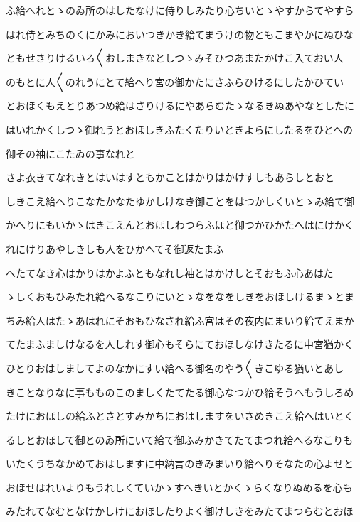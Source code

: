 \documentclass[a4paper,11pt,landscape]{ltjtarticle}
\begin{document}
ふ給へれとゝのゐ所のはしたなけに侍りしみたり心ちいとゝやすからてやすら
\par\medskip
はれ侍とみちのくにかみにおいつきかき給てまうけの物ともこまやかにぬひな
\par\medskip
ともせさりけるいろ〱おしまきなとしつゝみそひつあまたかけこ入ておい人
\par\medskip
のもとに人〱のれうにとて給へり宮の御かたにさふらひけるにしたかひてい
\par\medskip
とおほくもえとりあつめ給はさりけるにやあらむたゝなるきぬあやなとしたに
\par\medskip
はいれかくしつゝ御れうとおほしきふたくたりいときよらにしたるをひとへの
\par\medskip
御その袖にこたゐの事なれと
\par\medskip
さよ衣きてなれきとはいはすともかことはかりはかけすしもあらしとおと
\par\medskip
しきこえ給へりこなたかなたゆかしけなき御ことをはつかしくいとゝみ給て御
\par\medskip
かへりにもいかゝはきこえんとおほしわつらふほと御つかひかたへはにけかく
\par\medskip
れにけりあやしきしも人をひかへてそ御返たまふ
\par\medskip
へたてなき心はかりはかよふともなれし袖とはかけしとそおもふ心あはた
\par\medskip
ゝしくおもひみたれ給へるなこりにいとゝなをなをしきをおほしけるまゝとま
\par\medskip
ちみ給人はたゝあはれにそおもひなされ給ふ宮はその夜内にまいり給てえまか
\par\medskip
てたまふましけなるを人しれす御心もそらにておほしなけきたるに中宮猶かく
\par\medskip
ひとりおはしましてよのなかにすい給へる御名のやう〱きこゆる猶いとあし
\par\medskip
きことなりなに事もものこのましくたてたる御心なつかひ給そうへもうしろめ
\par\medskip
たけにおほしの給ふとさとすみかちにおはしますをいさめきこえ給へはいとく
\par\medskip
るしとおほして御とのゐ所にいて給て御ふみかきてたてまつれ給へるなこりも
\par\medskip
いたくうちなかめておはしますに中納言のきみまいり給へりそなたの心よせと
\par\medskip
おほせはれいよりもうれしくていかゝすへきいとかくゝらくなりぬめるを心も
\par\medskip
みたれてなむとなけかしけにおほしたりよく御けしきをみたてまつらむとおほ
\par\medskip
\end{document}
